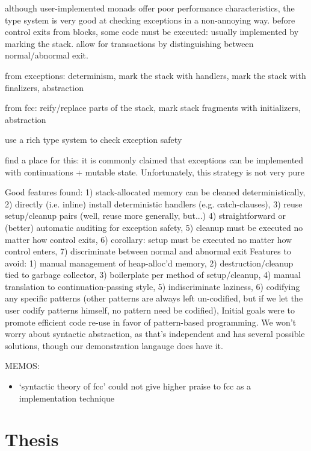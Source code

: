 \documentclass[11pt]{article}
\begin{document}
although user-implemented monads offer poor performance characteristics, the type system is very good at checking exceptions in a non-annoying way.
before control exits from blocks, some code must be executed: usually implemented by marking the stack.
allow for transactions by distinguishing between normal/abnormal exit.



from exceptions: determinism, mark the stack with handlers, mark the stack with finalizers, abstraction

from fcc: reify/replace parts of the stack, mark stack fragments with initializers, abstraction

use a rich type system to check exception safety

find a place for this: it is commonly claimed that exceptions can be implemented with continuations + mutable state. Unfortunately, this strategy is not very pure


Good features found:
  1) stack-allocated memory can be cleaned deterministically,
  2) directly (i.e. inline) install deterministic handlers (e.g. catch-clauses),
  3) reuse setup/cleanup pairs (well, reuse more generally, but...)
  4) straightforward or (better) automatic auditing for exception safety,
  5) cleanup must be executed no matter how control exits,
  6) corollary: setup must be executed no matter how control enters,
  7) discriminate between normal and abnormal exit
Features to avoid:
  1) manual management of heap-alloc'd memory,
  2) destruction/cleanup tied to garbage collector,
  3) boilerplate per method of setup/cleanup,
  4) manual translation to continuation-passing style,
  5) indiscriminate laziness,
  6) codifying any specific patterns (other patterns are always left un-codified, but if we let the user codify patterns himself, no pattern need be codified),
Initial goals were to promote efficient code re-use in favor of pattern-based programming.
We won't worry about syntactic abstraction, as that's independent and has several possible solutions, though our demonstration langauge does have it.


MEMOS:
\begin{itemize}
\item `syntactic theory of fcc' could not give higher praise to fcc as a implementation technique
\end{itemize}



\part{Thesis}
\end{document}
